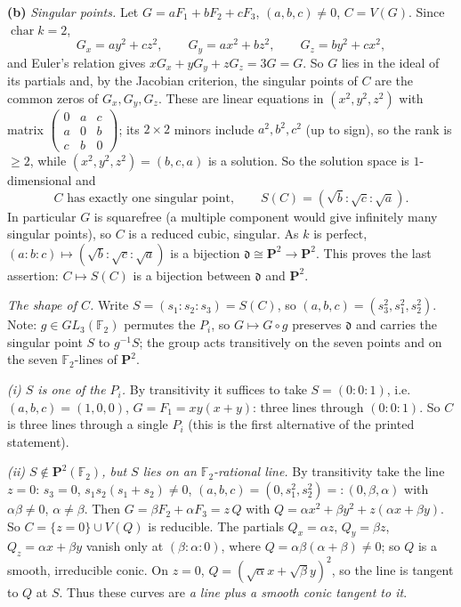 \documentclass[11pt]{article}
\begin{document}
\textbf{(b)} \emph{Singular points.} Let $G=aF_1+bF_2+cF_3$, $(a,b,c)\ne0$, $C=V(G)$. Since $\operatorname{char}k=2$,
\[
G_x=ay^2+cz^2,\qquad G_y=ax^2+bz^2,\qquad G_z=by^2+cx^2,
\]
and Euler's relation gives $xG_x+yG_y+zG_z=3G=G$. So $G$ lies in the ideal of its partials and, by the Jacobian criterion, the singular points of $C$ are the common zeros of $G_x,G_y,G_z$. These are linear equations in $(x^2,y^2,z^2)$ with matrix $\begin{pmatrix}0&a&c\\a&0&b\\c&b&0\end{pmatrix}$; its $2\times2$ minors include $a^2,b^2,c^2$ (up to sign), so the rank is $\ge2$, while $(x^2,y^2,z^2)=(b,c,a)$ is a solution. So the solution space is $1$-dimensional and
\[
C\text{ has exactly one singular point},\qquad S(C)=(\sqrt b:\sqrt c:\sqrt a).
\]
In particular $G$ is squarefree (a multiple component would give infinitely many singular points), so $C$ is a reduced cubic, singular. As $k$ is perfect, $(a:b:c)\mapsto(\sqrt b:\sqrt c:\sqrt a)$ is a bijection $\mathfrak d\cong\mathbf P^2\to\mathbf P^2$. This proves the last assertion: $C\mapsto S(C)$ is a bijection between $\mathfrak d$ and $\mathbf P^2$.

\emph{The shape of $C$.} Write $S=(s_1:s_2:s_3)=S(C)$, so $(a,b,c)=(s_3^2,s_1^2,s_2^2)$. Note: $g\in GL_3(\mathbb F_2)$ permutes the $P_i$, so $G\mapsto G\circ g$ preserves $\mathfrak d$ and carries the singular point $S$ to $g^{-1}S$; the group acts transitively on the seven points and on the seven $\mathbb F_2$-lines of $\mathbf P^2$.

\emph{(i) $S$ is one of the $P_i$.} By transitivity it suffices to take $S=(0:0:1)$, i.e.\ $(a,b,c)=(1,0,0)$, $G=F_1=xy(x+y)$: three lines through $(0:0:1)$. So $C$ is three lines through a single $P_i$ (this is the first alternative of the printed statement).

\emph{(ii) $S\notin\mathbf P^2(\mathbb F_2)$, but $S$ lies on an $\mathbb F_2$-rational line.} By transitivity take the line $z=0$: $s_3=0$, $s_1s_2(s_1+s_2)\ne0$, $(a,b,c)=(0,s_1^2,s_2^2)=:(0,\beta,\alpha)$ with $\alpha\beta\ne0$, $\alpha\ne\beta$. Then $G=\beta F_2+\alpha F_3=z\,Q$ with $Q=\alpha x^2+\beta y^2+z(\alpha x+\beta y)$. So $C=\{z=0\}\cup V(Q)$ is reducible. The partials $Q_x=\alpha z$, $Q_y=\beta z$, $Q_z=\alpha x+\beta y$ vanish only at $(\beta:\alpha:0)$, where $Q=\alpha\beta(\alpha+\beta)\ne0$; so $Q$ is a smooth, irreducible conic. On $z=0$, $Q=(\sqrt\alpha x+\sqrt\beta y)^2$, so the line is tangent to $Q$ at $S$. Thus these curves are \emph{a line plus a smooth conic tangent to it}.
\end{document}
